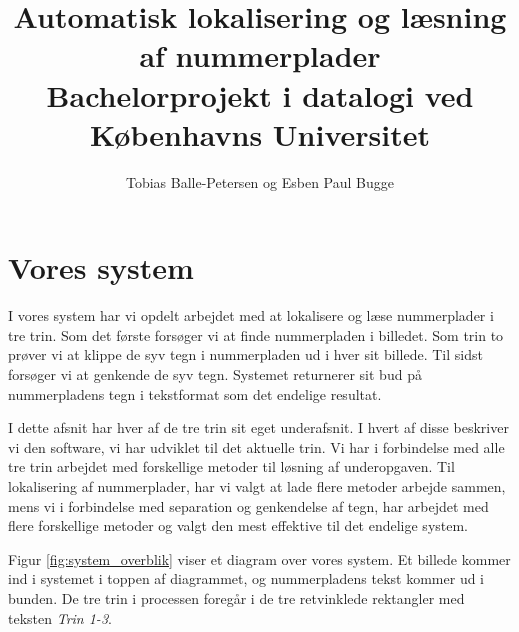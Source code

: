 \documentclass[11pt,a4paper,final]{article}
\author{Tobias Balle-Petersen og Esben Paul Bugge}
\title{Automatisk lokalisering og læsning af nummerplader\\\large{Bachelorprojekt i datalogi ved Københavns Universitet}}
\begin{document}
\maketitle
\newpage
\tableofcontents
\newpage


\section{Vores system}
I vores system har vi opdelt arbejdet med at lokalisere og læse nummerplader i tre trin. Som det første forsøger vi at finde nummerpladen i billedet. Som trin to prøver vi at klippe de syv tegn i nummerpladen ud i hver sit billede. Til sidst forsøger vi at genkende de syv tegn. Systemet returnerer sit bud på nummerpladens tegn i tekstformat som det endelige resultat.

I dette afsnit har hver af de tre trin sit eget underafsnit. I hvert af disse beskriver vi den software, vi har udviklet til det aktuelle trin. Vi har i forbindelse med alle tre trin arbejdet med forskellige metoder til løsning af underopgaven. Til lokalisering af nummerplader, har vi valgt at lade flere metoder arbejde sammen, mens vi i forbindelse med separation og genkendelse af tegn, har arbejdet med flere forskellige metoder og valgt den mest effektive til det endelige system.

 Figur \ref{fig:system_overblik} viser et diagram over vores system. Et billede kommer ind i systemet i toppen af diagrammet, og nummerpladens tekst kommer ud i bunden. De tre trin i processen foregår i de tre retvinklede rektangler med teksten \textit{Trin 1-3}. 
\end{document}
